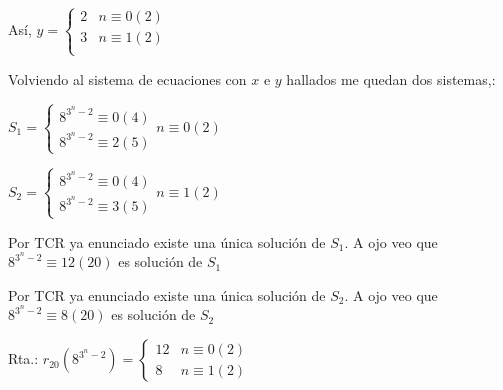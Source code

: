 Así, $ y = \begin{cases}
    2 & n \equiv 0 (2) \\
    3 & n \equiv 1 (2) \\
\end{cases} $

Volviendo al sistema de ecuaciones con $x$ e $y$ hallados me quedan dos sistemas,:

$ S_1 = \begin{cases}
    8^{3^n-2} \equiv 0 (4) \\
    8^{3^n-2} \equiv 2 (5)
\end{cases} n \equiv 0(2)$

$ S_2 = \begin{cases}
    8^{3^n-2} \equiv 0 (4) \\
    8^{3^n-2} \equiv 3 (5)
\end{cases} n \equiv 1(2)$

Por TCR ya enunciado existe una única solución de $S_1$. A ojo veo que $ 8^{3^n-2} \equiv 12(20) $ es solución de $S_1$

Por TCR ya enunciado existe una única solución de $S_2$. A ojo veo que $ 8^{3^n-2} \equiv 8(20) $ es solución de $S_2$

Rta.: $ r_{20}(8^{3^n-2}) = \begin{cases}
    12 & n \equiv 0(2) \\
    8 & n \equiv 1(2)
\end{cases} $



